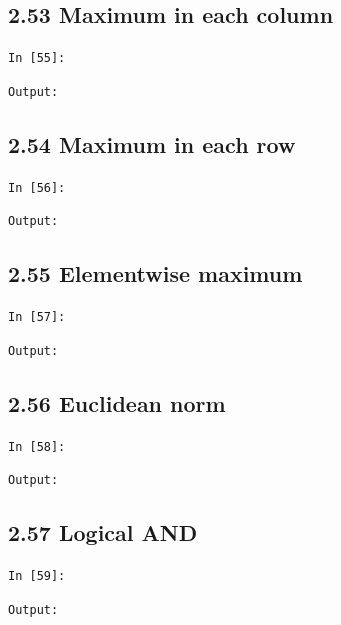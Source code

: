 \documentclass[11pt]{article}
\begin{document}
\par\medskip\noindent\begin{minipage}{\linewidth}
\subsection*{2.53 Maximum in each column}
\noindent\texttt{In [55]:}

\noindent\texttt{Output:}

\end{minipage}\par

\par\medskip\noindent\begin{minipage}{\linewidth}
\subsection*{2.54 Maximum in each row}
\noindent\texttt{In [56]:}

\noindent\texttt{Output:}

\end{minipage}\par

\par\medskip\noindent\begin{minipage}{\linewidth}
\subsection*{2.55 Elementwise maximum}
\noindent\texttt{In [57]:}

\noindent\texttt{Output:}

\end{minipage}\par

\par\medskip\noindent\begin{minipage}{\linewidth}
\subsection*{2.56 Euclidean norm}
\noindent\texttt{In [58]:}

\noindent\texttt{Output:}

\end{minipage}\par

\par\medskip\noindent\begin{minipage}{\linewidth}
\subsection*{2.57 Logical AND}
\noindent\texttt{In [59]:}

\noindent\texttt{Output:}

\end{minipage}\par
\end{document}
